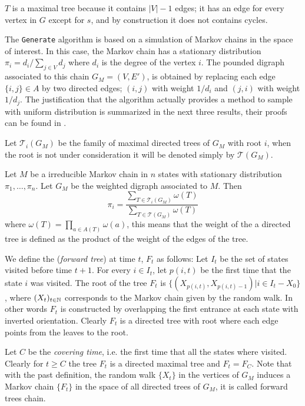 $T$ is a maximal tree because it contains $|V| - 1$ edges; it has an edge for every vertex in $G$ except for $s$, and by construction it does not contains cycles.

The \texttt{Generate} algorithm is based on a simulation of Markov chains in the space of interest. In this case, the Markov chain has a stationary distribution $\pi_{i}=d_{i}/\sum_{j\in V} d_{j}$ where $d_{i}$ is the degree of the vertex $i$. The pounded digraph associated to this chain $G_M =(V,E')$, is obtained by replacing each edge $\{i,j\}\in A$ by two directed edges; $(i,j)$ with weight $1/d_{i}$ and $(j,i)$ with weight $1/d_{j}$. The justification that the algorithm actually provides a method to sample with uniform distribution is summarized in the next three results, their proofs can be found in \cite[Broder 89]{Broder89}.

Let $\mathcal{T}_{i}(G_{M})$ be the family of maximal directed trees of $G_{M}$ with root $i$, when the root is not under consideration it will be denoted simply by $\mathcal{T}(G_{M})$.

\begin{theorem}
Let $M$ be a irreducible Markov chain in $n$ states with stationary distribution $\pi_1, \dots, \pi_n$. Let $G_{M}$ be the weighted digraph associated to $M$. Then $$\pi_{i} = \frac{\sum_{ T \in \mathcal{T}_{i}(G_{M})} \omega (T)}{\sum _{T \in \mathcal{T}(G_{M})} \omega (T)}$$
where $\omega(T) = \prod_{a\in A(T)}\omega(a)$, this means that the weight of the a directed tree is defined as the product of the weight of the edges of the tree.
\end{theorem}

We define the (\textit{forward tree}) at time $t$, $F_{t}$ as follows: Let $I_{t}$ be the set of states visited before time $t+1$. For every $i\in I_{t}$, let $p(i,t)$ be the first time that the state $i$ was visited. The root of the tree $F_{t}$ is $\{(X_{p(i,t)},X_{p(i,t)-1}) | i\in I_{t}-X_{0}\}$, where $(X_{t})_{t\in \mathbb{N}}$ corresponds to the Markov chain given by the random walk. In other words $F_{t}$ is constructed by overlapping the first entrance at each state with inverted orientation. Clearly $F_{t}$ is a directed tree with root where each edge points from the leaves to the root.

Let $C$ be the \textit{covering time}, i.e. the first time that all the states where visited. Clearly for $t\geq C$ the tree $F_{t}$ is a directed maximal tree and $F_{t}=F_{C}$. Note that with the past definition, the random walk $\{X_{t}\}$ in the vertices of $G_{M}$ induces a Markov chain $\{F_{t}\}$ in the space of all directed trees of $G_{M}$, it is called forward trees chain.

